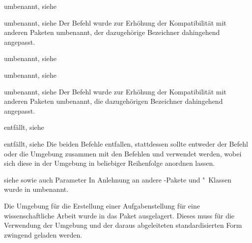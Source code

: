 \begin{Declaration}{}{%
  umbenannt, siehe %
}
\begin{Declaration}{}{umbenannt, siehe }
\printdeclarationlist*%
%
Der Befehl wurde zur Erhöhung der Kompatibilität mit anderen Paketen umbenannt, 
der dazugehörige Bezeichner dahingehend angepasst.
\end{Declaration}
\end{Declaration}

\begin{Declaration}{}{%
  umbenannt, siehe %
}
\begin{Declaration}{}{%
  umbenannt, siehe 
}
\begin{Declaration}{}{%
  umbenannt, siehe %
}
\printdeclarationlist*%
%
Der Befehl wurde zur Erhöhung der Kompatibilität mit anderen Paketen umbenannt, 
die dazugehörigen Bezeichner dahingehend angepasst.
\end{Declaration}
\end{Declaration}
\end{Declaration}

\begin{Declaration}{}{%
  entfällt, siehe %
}
\begin{Declaration}{}{%
  entfällt, siehe %
}
\printdeclarationlist*%
%
Die beiden Befehle entfallen, stattdessen sollte entweder der Befehl 
 oder die Umgebung  zusammen mit 
den Befehlen  und  verwendet werden, 
wobei sich diese in der Umgebung in beliebiger Reihenfolge anordnen lassen.
\end{Declaration}
\end{Declaration}

\begin{Declaration}{}{%
  siehe  sowie auch Parameter %
}
\printdeclarationlist*%
In Anlehnung an andere -Pakete und "~Klassen wurde 
 in  umbenannt.
\end{Declaration}



Die Umgebung für die Erstellung einer Aufgabenstellung für eine 
wissenschaftliche Arbeit wurde in das Paket  
ausgelagert. Dieses muss für die Verwendung der Umgebung  
und der daraus abgeleiteten standardisierten Form zwingend geladen werden.


